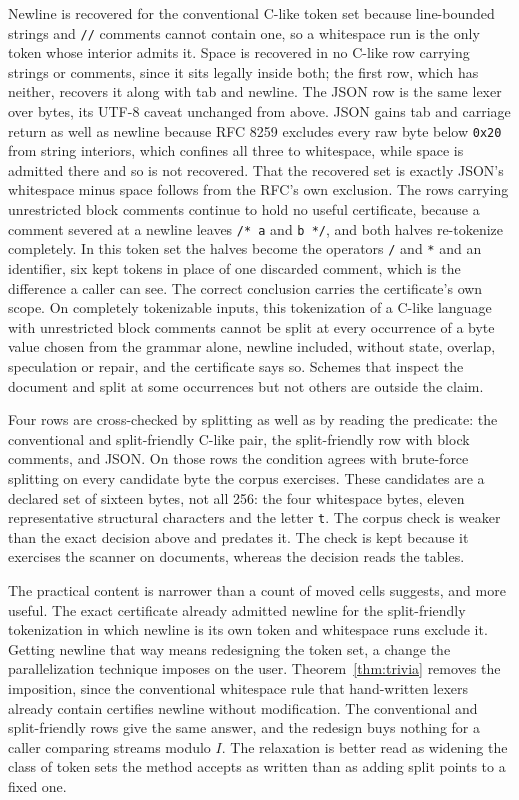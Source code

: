 \documentclass[11pt,a4paper]{article}
\theoremstyle{definition}
\theoremstyle{plain}
\newcommand{\code}[1]{\texttt{#1}}
\begin{document}
Newline is recovered for the conventional C-like token set because line-bounded strings and \code{//} comments cannot
contain one, so a whitespace run is the only token whose interior admits it. Space is recovered in no C-like row
carrying strings or comments, since it sits legally inside both; the first row, which has neither, recovers it along
with tab and newline. The JSON row is the same lexer over bytes, its UTF-8 caveat unchanged from above. JSON gains tab
and carriage return as well as newline because RFC 8259 excludes every raw byte below \code{0x20} from string interiors,
which confines all three to whitespace, while space is admitted there and so is not recovered. That the recovered set is
exactly JSON's whitespace minus space follows from the RFC's own exclusion. The rows carrying unrestricted block
comments continue to hold no useful certificate, because a comment severed at a newline leaves \code{/*\,a} and
\code{b\,*/}, and both halves re-tokenize completely. In this token set the halves become the operators \code{/} and
\code{*} and an identifier, six kept tokens in place of one discarded comment, which is the difference a caller can see.
The correct conclusion carries the certificate's own scope. On completely tokenizable inputs, this tokenization of a
C-like language with unrestricted block comments cannot be split at every occurrence of a byte value chosen from the
grammar alone, newline included, without state, overlap, speculation or repair, and the certificate says so. Schemes
that inspect the document and split at some occurrences but not others are outside the claim.

Four rows are cross-checked by splitting as well as by reading the predicate: the conventional and split-friendly C-like
pair, the split-friendly row with block comments, and JSON. On those rows the condition agrees with brute-force
splitting on every candidate byte the corpus exercises. These candidates are a declared set of sixteen bytes, not all
256: the four whitespace bytes, eleven representative structural characters and the letter \code{t}. The corpus check is
weaker than the exact decision above and predates it. The check is kept because it exercises the scanner on documents,
whereas the decision reads the tables.

The practical content is narrower than a count of moved cells suggests, and more useful. The exact certificate already
admitted newline for the split-friendly tokenization in which newline is its own token and whitespace runs exclude it.
Getting newline that way means redesigning the token set, a change the parallelization technique imposes on the user.
Theorem~\ref{thm:trivia} removes the imposition, since the conventional whitespace rule that hand-written lexers already
contain certifies newline without modification. The conventional and split-friendly rows give the same answer, and the
redesign buys nothing for a caller comparing streams modulo $I$. The relaxation is better read as widening the class of
token sets the method accepts as written than as adding split points to a fixed one.
\end{document}
